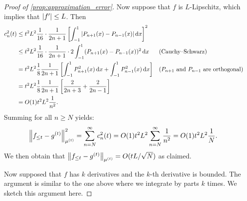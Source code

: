 \documentclass[../hippo.tex]{subfiles}
\begin{document}
\begin{proof}[Proof of \cref{prop:approximation_error}]
  Now suppose that $f$ is $L$-Lipschitz, which implies that $\left\lvert f'\right\rvert \leq L$.
  Then
  \begin{align*}
    c_n^2(t)
    &\leq t^2 L^2 \frac{1}{16} \cdot \frac{1}{2n+1} \left[ \int_{-1}^{1} \left\lvert P_{n+1}(x) - P_{n-1}(x)\right\rvert \mathop{}\!\mathrm{d} x \right]^2 \\
    &\leq t^2 L^2 \frac{1}{16} \cdot \frac{1}{2n+1} \cdot 2 \int_{-1}^{1} (P_{n+1}(x) - P_{n-1}(x))^2 \mathop{}\!\mathrm{d} x && \text{(Cauchy--Schwarz)} \\
    &= t^2 L^2 \frac{1}{8} \frac{1}{2n+1} \left[ \int_{-1}^{1} P_{n+1}^2(x) \mathop{}\!\mathrm{d} x + \int_{-1}^{1} P_{n-1}^2(x) \mathop{}\!\mathrm{d} x \right] && \text{($P_{n+1}$ and $P_{n-1}$ are orthogonal)} \\
    &= t^2 L^2 \frac{1}{8} \frac{1}{2n+1} \left[ \frac{2}{2n+3} + \frac{2}{2n-1} \right] \\
    &= O(1) t^2 L^2 \frac{1}{n^2}.
  \end{align*}
  Summing for all $n \geq N$ yields:
  \begin{align*}
    \left\|{f_{\leq t} - g^{(t)}}\right\|^2_{\mu^{(t)}}
    &= \sum_{n=N}^{\infty} c_n^2(t) = O(1) t^2 L^2 \sum_{n=N}^{\infty} \frac{1}{n^2} = O(1) t^2 L^2 \frac{1}{N}.
  \end{align*}
  We then obtain that $\left\|{f_{\leq t} - g^{(t)}}\right\|_{\mu^{(t)}} = O(tL/\sqrt{N})$ as claimed.

  Now supposed that $f$ has $k$ derivatives and the $k$-th derivative is bounded.
  The argument is similar to the one above where we integrate by parts $k$
  times.
  We sketch this argument here.


\end{proof}
\end{document}
